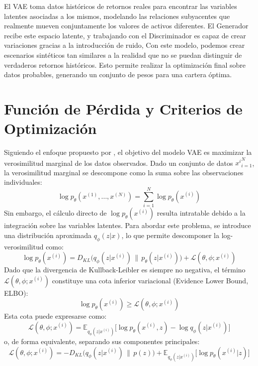 El VAE toma datos históricos de retornos reales para encontrar las variables latentes asociadas a los mismos, modelando las relaciones subyacentes que realmente mueven conjuntamente los valores de activos diferentes. El Generador recibe este espacio latente, y trabajando con el Discriminador es capaz de crear variaciones gracias a la introducción de ruido, Con este modelo, podemos crear escenarios sintéticos tan similares a la realidad que no se puedan distinguir de verdaderos retornos históricos. Esto permite realizar la optimización final sobre datos probables, generando un conjunto de pesos para una cartera óptima. 

\section{Función de Pérdida y Criterios de Optimización}

Siguiendo el enfoque propuesto por \cite{kingma2013auto}, el objetivo del modelo VAE es maximizar la verosimilitud marginal de los datos observados. Dado un conjunto de datos ${x^{i}}_{i=1}^N$, la verosimilitud marginal se descompone como la suma sobre las observaciones individuales:
\begin{equation}
    \log p_{\theta}(x^{(1)}, \dots, x^{(N)}) = \sum_{i=1}^{N} \log p_{\theta}(x^{(i)})
\end{equation}
Sin embargo, el cálculo directo de $\log p_{\theta}(x^{(i)})$ resulta intratable debido a la integración sobre las variables latentes. Para abordar este problema, se introduce una distribución aproximada $q_{\phi}(z|x)$, lo que permite descomponer la log-verosimilitud como:
\begin{equation}
    \log p_{\theta}(x^{(i)}) 
= D_{KL}\big(q_{\phi}(z|x^{(i)}) \,\|\, p_{\theta}(z|x^{(i)})\big)
+ \mathcal{L}(\theta, \phi; x^{(i)})
\end{equation}
Dado que la divergencia de Kullback-Leibler es siempre no negativa, el término $\mathcal{L}(\theta, \phi; x^{(i)})$ constituye una cota inferior variacional (Evidence Lower Bound, ELBO):
\begin{equation}
    \log p_{\theta}(x^{(i)}) \geq \mathcal{L}(\theta, \phi; x^{(i)})
\end{equation}
Esta cota puede expresarse como:
\begin{equation}
    \mathcal{L}(\theta, \phi; x^{(i)}) 
= \mathbb{E}_{q_{\phi}(z|x^{(i)})}
\big[
\log p_{\theta}(x^{(i)}, z) - \log q_{\phi}(z|x^{(i)})
\big]
\end{equation}
o, de forma equivalente, separando sus componentes principales:
\begin{equation}
    \mathcal{L}(\theta, \phi; x^{(i)}) 
= -D_{KL}\big(q_{\phi}(z|x^{(i)}) \,\|\, p(z)\big)
+ \mathbb{E}_{q_{\phi}(z|x^{(i)})}\big[\log p_{\theta}(x^{(i)}|z)\big]
\end{equation}

